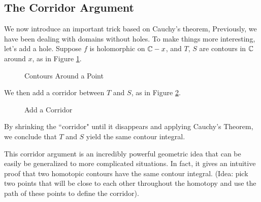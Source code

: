 \subsection{The Corridor Argument}
We now introduce an important trick based on Cauchy's theorem, Previously, we have been dealing with domains without holes. To make things more
interesting, let's add a hole. Suppose $f$ is holomorphic on ${\mathbb C} - x$,
and $T$, $S$ are contours in ${\mathbb C}$ around $x$, as in Figure \ref{fig:Contour-around-a-Point}.
\begin{figure}[ht]
    \centering
    \caption{Contours Around a Point}
    \label{fig:Contour-around-a-Point}
\end{figure}
We then add a corridor between $T$ and $S$, as in Figure \ref{fig:Add-a-Keyhole}.
\begin{figure}[ht]
    \centering
    \caption{Add a Corridor}
    \label{fig:Add-a-Keyhole}
\end{figure}
By shrinking the ``corridor" until it disappears 
and applying Cauchy's Theorem, we conclude that $T$ and $S$ yield the same contour integral.

This corridor argument is an incredibly powerful geometric idea that can be easily be generalized to more complicated situations. In fact, it gives an intuitive proof that two homotopic contours have the same contour integral. (Idea: pick two points that will be close to each other throughout the homotopy and use the path of these points to define the corridor).
